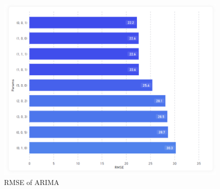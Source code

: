 \documentclass[11pt, a4paper]{article}
\begin{document}
\begin{figure}
    \centering
    \includegraphics[width=\textwidth]{ARIMA_RMSE.png}
    \caption{RMSE of ARIMA}
    \label{fig:arima_rmse}
\end{figure}
\end{document}
